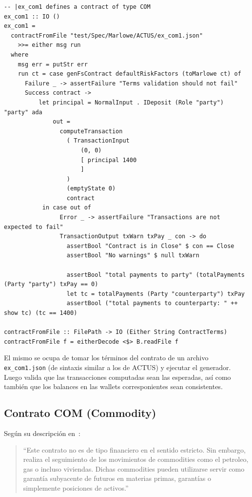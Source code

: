 \documentclass[12pt]{book}
\begin{document}
\begin{lstlisting}[style=Haskell-cardano, caption=Test de ejemplo escrito durante el desarrollo de la tesis para el contrato COM]
-- |ex_com1 defines a contract of type COM
ex_com1 :: IO ()
ex_com1 =
  contractFromFile "test/Spec/Marlowe/ACTUS/ex_com1.json"
    >>= either msg run
  where
    msg err = putStr err
    run ct = case genFsContract defaultRiskFactors (toMarlowe ct) of
      Failure _ -> assertFailure "Terms validation should not fail"
      Success contract ->
          let principal = NormalInput . IDeposit (Role "party") "party" ada
              out =
                computeTransaction
                  ( TransactionInput
                      (0, 0)
                      [ principal 1400
                      ]
                  )
                  (emptyState 0)
                  contract
           in case out of
                Error _ -> assertFailure "Transactions are not expected to fail"
                TransactionOutput txWarn txPay _ con -> do
                  assertBool "Contract is in Close" $ con == Close
                  assertBool "No warnings" $ null txWarn

                  assertBool "total payments to party" (totalPayments (Party "party") txPay == 0)
                  let tc = totalPayments (Party "counterparty") txPay
                  assertBool ("total payments to counterparty: " ++ show tc) (tc == 1400)

contractFromFile :: FilePath -> IO (Either String ContractTerms)
contractFromFile f = eitherDecode <$> B.readFile f
\end{lstlisting}

El mismo se ocupa de tomar los términos del contrato de un archivo \texttt{ex\_com1.json} (de sintaxis similar a los de ACTUS) y ejecutar el generador. Luego valida que las transacciones computadas sean las esperadas, así como también que los balances en las wallets corresponientes sean consistentes.

\subsection{Contrato COM (Commodity)}

Según su descripción en~\cite{ACTUS_Dictionary}:

\begin{quote} 
``Este contrato no es de tipo financiero en el sentido estricto. Sin embargo, realiza el seguimiento de los movimientos de commodities como el petroleo, gas o incluso viviendas. Dichas commodities pueden utilizarse servir como garantía subyacente de futuros en materias primas, garantías o simplemente posiciones de activos.''
\end{quote}
\end{document}

